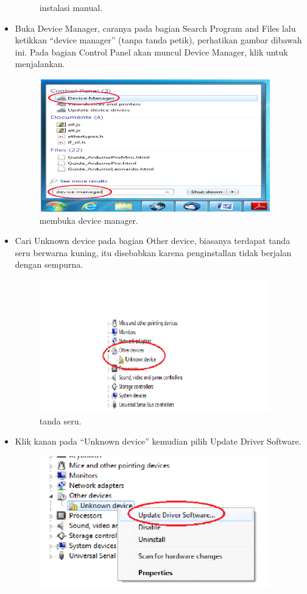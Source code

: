 \begin{itemize}
\begin{figure}[ht]
				\centering
				\caption{instalasi manual.}
			\end{figure}
		\item Buka Device Manager, caranya pada bagian Search Program and Files lalu ketikkan “device manager” (tanpa tanda petik), perhatikan gambar dibawah ini. Pada bagian Control Panel akan muncul Device Manager, klik untuk menjalankan.
			\begin{figure}[ht]
				\includegraphics[width=10cm]{figures/5/1174083/Teori/4.png}
				\centering
				\caption{membuka device manager.}
			\end{figure}
		\item Cari Unknown device pada bagian Other device, biasanya terdapat tanda seru berwarna kuning, itu disebabkan karena penginstallan tidak berjalan dengan sempurna.
			\begin{figure}[ht]
				\includegraphics[width=10cm]{figures/5/1174083/Teori/5.png}
				\centering
				\caption{tanda seru.}
			\end{figure}
		\item Klik kanan pada “Unknown device” kemudian pilih Update Driver Software.		
			\begin{figure}[ht]
				\includegraphics[width=10cm]{figures/5/1174083/Teori/6.png}

\end{figure}
\end{itemize}
